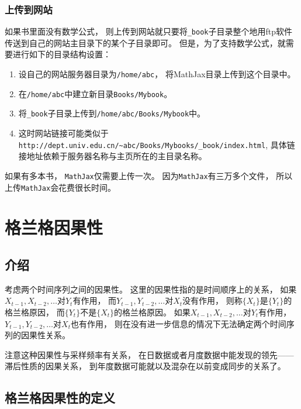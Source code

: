 \documentclass[
]{book}
\providecommand{\tightlist}{%
  \setlength{\itemsep}{0pt}\setlength{\parskip}{0pt}}
\theoremstyle{definition}
\theoremstyle{definition}
\theoremstyle{definition}
\theoremstyle{definition}
\theoremstyle{remark}
\begin{document}
\hypertarget{usage-website}{%
\subsection{上传到网站}\label{usage-website}}

如果书里面没有数学公式，
则上传到网站就只要将\texttt{\_book}子目录整个地用ftp软件传送到自己的网站主目录下的某个子目录即可。
但是，为了支持数学公式，就需要进行如下的目录结构设置：

\begin{enumerate}
\def\labelenumi{\arabic{enumi}.}
\tightlist
\item
  设自己的网站服务器目录为\texttt{/home/abc}，
  将MathJax目录上传到这个目录中。
\item
  在\texttt{/home/abc}中建立新目录\texttt{Books/Mybook}。
\item
  将\texttt{\_book}子目录上传到\texttt{/home/abc/Books/Mybook}中。
\item
  这时网站链接可能类似于\texttt{http://dept.univ.edu.cn/\textasciitilde{}abc/Books/Mybooks/\_book/index.html},
  具体链接地址依赖于服务器名称与主页所在的主目录名称。
\end{enumerate}

如果有多本书，
\texttt{MathJax}仅需要上传一次。
因为\texttt{MathJax}有三万多个文件，
所以上传\texttt{MathJax}会花费很长时间。

\hypertarget{causal}{%
\chapter{格兰格因果性}\label{causal}}

\hypertarget{causal-intro}{%
\section{介绍}\label{causal-intro}}

考虑两个时间序列之间的因果性。
这里的因果性指的是时间顺序上的关系，
如果\(X_{t-1}, X_{t-2}, \dots\)对\(Y_t\)有作用，
而\(Y_{t-1}, Y_{t-2}, \dots\)对\(X_t\)没有作用，
则称\(\{X_t \}\)是\(\{ Y_t \}\)的格兰格原因，
而\(\{ Y_t \}\)不是\(\{ X_t \}\)的格兰格原因。
如果\(X_{t-1}, X_{t-2}, \dots\)对\(Y_t\)有作用，
\(Y_{t-1}, Y_{t-2}, \dots\)对\(X_t\)也有作用，
则在没有进一步信息的情况下无法确定两个时间序列的因果性关系。

注意这种因果性与采样频率有关系，
在日数据或者月度数据中能发现的领先------滞后性质的因果关系，
到年度数据可能就以及混杂在以前变成同步的关系了。

\hypertarget{causal-def}{%
\section{格兰格因果性的定义}\label{causal-def}}
\end{document}
